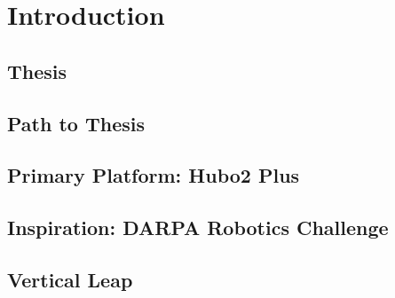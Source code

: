 \chapter{Introduction}
	\section{Thesis} %
		


	\section{Path to Thesis}\label{sec:roadmap}	
		

	\section{Primary Platform: Hubo2 Plus}\label{sec:hubo}
			




	\section{Inspiration: DARPA Robotics Challenge}\label{sec:drc}
    		

    	\section{Vertical Leap}
		


	
